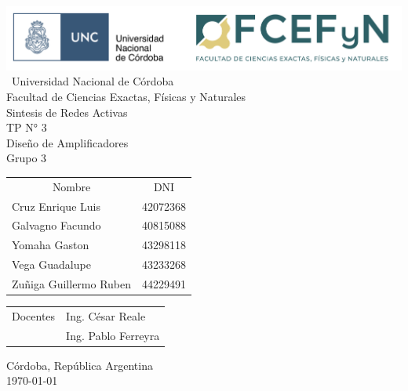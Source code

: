 \begin{titlepage}

\begin{center}
    \includegraphics[width=15cm]{img/color_UNC-FCEFyN.png} 
    \\[1cm]
    \vspace{5pt}
    \ \LARGE Universidad Nacional de Córdoba\\[0.5cm] 
    \large Facultad de Ciencias Exactas, Físicas y Naturales \\[0.5cm] 
    \large Sintesis de Redes Activas
    \\[0.2cm]
    \large TP N° 3
    \\[0.2cm]
    \large Diseño de Amplificadores
    \\[0.2cm]
    \large Grupo 3
    \\[0.2cm]
    \vspace{60pt}
    \begin{table}[!h]
    \centering
    \begin{tabular}{ll}
    \multicolumn{1}{c}{Nombre} & \multicolumn{1}{c}{DNI} \\
    Cruz Enrique Luis & 42072368 \\
    Galvagno Facundo& 40815088 \\
    Yomaha Gaston & 43298118 \\
    Vega Guadalupe & 43233268 \\
    Zuñiga Guillermo Ruben & 44229491\\
    
    \end{tabular}
    \end{table}
    \vspace{20pt}
    \begin{table}[!h]
    \centering
    \begin{tabular}{ll}
    \multicolumn{1}{c}{Docentes} & Ing. César Reale \\
     & Ing. Pablo Ferreyra
    \end{tabular}
    \end{table}
    \vfill
    Córdoba, República Argentina\\
    \today
\end{center}

\end{titlepage}
